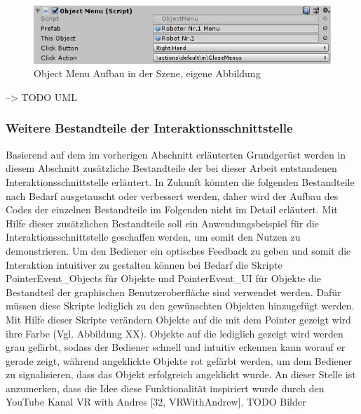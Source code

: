 \begin{figure}[h]
	\centering
	\includegraphics[width=0.5\linewidth]{Bilder/A46_ObjectMenu}
	\caption{Object Menu Aufbau in der Szene, eigene Abbildung}
	\label{fig:ObjectMenu}
\end{figure}
\newline
--> TODO UML

\subsubsection{Weitere Bestandteile der Interaktionsschnittstelle}\label{sec:WeitereTeileInteraktion}
Basierend auf dem im vorherigen Abschnitt erläuterten Grundgerüst werden in diesem Abschnitt zusätzliche Bestandteile der bei dieser Arbeit entstandenen Interaktionsschnittstelle erläutert. In Zukunft könnten die folgenden Bestandteile nach Bedarf ausgetauscht oder verbessert werden, daher wird der Aufbau des Codes der einzelnen Bestandteile im Folgenden nicht im Detail erläutert. Mit Hilfe dieser zusätzlichen Bestandteile soll ein Anwendungsbeispiel für die Interaktionsschnittstelle geschaffen werden, um somit den Nutzen zu demonstrieren.
\newline\newline
Um den Bediener ein optisches Feedback zu geben und somit die Interaktion intuitiver zu gestalten können bei Bedarf die Skripte PointerEvent\_Objects für Objekte und PointerEvent\_UI für Objekte die Bestandteil der graphischen Benutzeroberfläche sind verwendet werden. Dafür müssen diese Skripte lediglich zu den gewünschten Objekten hinzugefügt werden. Mit Hilfe dieser Skripte verändern Objekte auf die mit dem Pointer gezeigt wird ihre Farbe (Vgl. Abbildung XX). Objekte auf die lediglich gezeigt wird werden grau gefärbt, sodass der Bediener schnell und intuitiv erkennen kann worauf er gerade zeigt, während angeklickte Objekte rot gefärbt werden, um dem Bediener zu signalisieren, dass das Objekt erfolgreich angeklickt wurde. An dieser Stelle ist anzumerken, dass die Idee diese Funktionalität inspiriert wurde durch den YouTube Kanal VR with Andres [32, VRWithAndrew].
\newline TODO Bilder
\newline\newline
